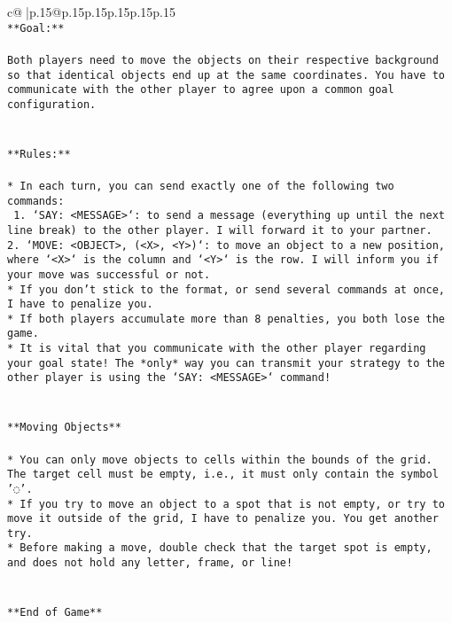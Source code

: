 \documentclass{article}
\begin{document}
{\begin{supertabular}{c@{$\;$}|p{.15\linewidth}@{}p{.15\linewidth}p{.15\linewidth}p{.15\linewidth}p{.15\linewidth}p{.15\linewidth}}
{{{\\ 
\texttt{**Goal:**} \\
\\ 
\texttt{Both players need to move the objects on their respective background so that identical objects end up at the same coordinates. You have to communicate with the other player to agree upon a common goal configuration.} \\
\\ 
\\ 
\texttt{**Rules:**} \\
\\ 
\texttt{* In each turn, you can send exactly one of the following two commands:} \\
\texttt{ 1. `SAY: <MESSAGE>`: to send a message (everything up until the next line break) to the other player. I will forward it to your partner.} \\
\texttt{2. `MOVE: <OBJECT>, (<X>, <Y>)`: to move an object to a new position, where `<X>` is the column and `<Y>` is the row. I will inform you if your move was successful or not.} \\
\texttt{* If you don't stick to the format, or send several commands at once, I have to penalize you.} \\
\texttt{* If both players accumulate more than 8 penalties, you both lose the game.} \\
\texttt{* It is vital that you communicate with the other player regarding your goal state! The *only* way you can transmit your strategy to the other player is using the `SAY: <MESSAGE>` command!} \\
\\ 
\\ 
\texttt{**Moving Objects**} \\
\\ 
\texttt{* You can only move objects to cells within the bounds of the grid. The target cell must be empty, i.e., it must only contain the symbol '◌'.} \\
\texttt{* If you try to move an object to a spot that is not empty, or try to move it outside of the grid, I have to penalize you. You get another try.} \\
\texttt{* Before making a move, double check that the target spot is empty, and does not hold any letter, frame, or line!} \\
\\ 
\\ 
\texttt{**End of Game**} \\
\\ 
}}}
\end{supertabular}}
\end{document}
